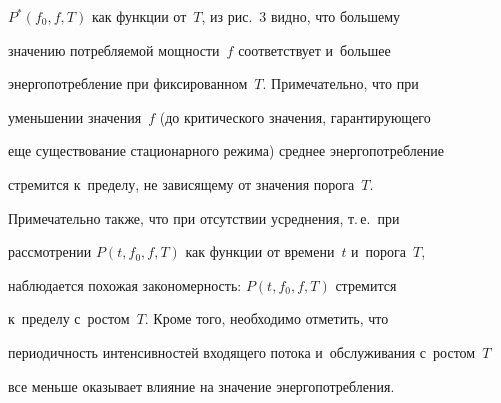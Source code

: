 $P^*(f_0,f,T)$ как функции от~$T$, из рис.~3 видно, что большему

значению потребляемой мощности~$f$ соответствует и~большее

энергопотребление при фиксированном~$T$. Примечательно, что при

уменьшении значения~$f$ (до критического значения, гарантирующего

еще существование стационарного режима) среднее энергопотребление

стремится к~пределу, не зависящему от значения порога~$T$.

Примечательно также, что при отсутствии усреднения, т.\,е.\ при

рассмотрении $P(t,f_0,f,T)$ как функции от времени~$t$ и~порога~$T$,

наблюдается похожая закономерность: $P(t,f_0,f,T)$ стремится 

к~пределу с~ростом~$T$. Кроме того, необходимо отметить, что

периодичность интенсивностей входящего потока и~обслуживания с~ростом~$T$ 

все меньше оказывает влияние на значение энергопотребления.









